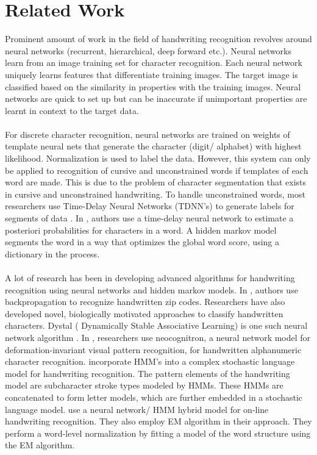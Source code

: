 \documentclass[oribibl]{llncs}
\begin{document}
\section{Related Work}
 
Prominent amount of work in the field of handwriting recognition revolves around neural networks (recurrent, hierarchical, deep forward etc.). Neural networks learn from an image training set for character recognition. Each neural network uniquely learns features that differentiate training images. The target image is classified based on the similarity in properties with the training images. Neural networks are quick to set up but can be inaccurate if unimportant properties are learnt in context to the target data. 
\\
\\
For discrete character recognition, neural networks are trained on weights of template neural nets that generate the character (digit/ alphabet) with highest likelihood. Normalization is used to label the data. However, this system can only be applied to recognition of cursive and unconstrained words if templates of each word are made. This is due to the problem of character segmentation that exists in cursive and unconstrained handwriting. To handle unconstrained words, most researchers use Time-Delay Neural Networks (TDNN's) to generate labels for segments of data \cite{mantas1986overview}. In \cite{tddnn}, authors use a time-delay neural network to estimate a posteriori probabilities for characters in a word. A hidden markov model segments the word in a way that optimizes the global word score, using a dictionary in the process.
\\
\\
A lot of research has been in developing advanced algorithms for handwriting recognition using neural networks and hidden markov models. In \cite{LeCun:1989:BAH:1351079.1351090}, authors use backpropagation to recognize handwritten zip codes. Researchers have also developed novel, biologically motivated approaches to classify handwritten characters. Dystal ( Dynamically Stable Associative Learning) is one such neural network algorithm \cite{Blackwell1992655}. In \cite{97912}, researchers use neocognitron, a neural network model for deformation-invariant visual pattern recognition, for handwritten alphanumeric character recognition. \cite{541414} incorporate HMM's into a complex stochastic language model for handwriting recognition. The pattern elements of the handwriting model are subcharacter stroke types modeled by HMMs. These HMMs are concatenated to form letter models, which are further embedded in a stochastic language model. \cite{Bengio95lerec:a} use a neural network/ HMM hybrid model for on-line handwriting recognition. They also employ EM algorithm in their approach. They perform a word-level normalization by fitting a model of the word structure using the EM algorithm. 
\end{document}

